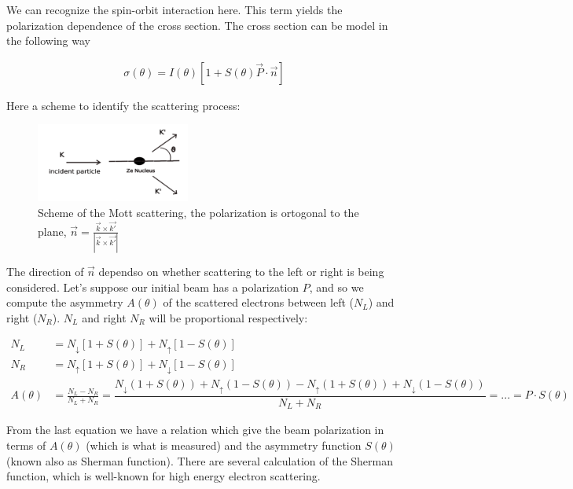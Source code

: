 We can recognize the spin-orbit interaction here. This term yields the polarization dependence of the cross section. The cross section can be model in the following way

\begin{align*}
\sigma(\theta) = I(\theta) [1 + S(\theta) \vec{P} \cdot \vec{n} ]
\end{align*}

Here a scheme to identify the scattering process: 

\begin{figure}[hbtp]
\centering
\includegraphics[width = 0.45\textwidth]{ExperimentalSetup/mottFig.png}
\caption{Scheme of the Mott scattering, the polarization is ortogonal to the plane,  $ \vec{n} = \frac{\vec{k} \times \vec{k'}}{|\vec{k} \times \vec{k'}|}$}
\end{figure}

The direction of $\vec{n}$ dependso on whether scattering to the left or right is being considered. Let's suppose our initial beam has a polarization $P$, and so we compute the asymmetry $A(\theta)$ of the scattered electrons between left ($N_{L}$) and right ($N_{R}$). $N_{L}$ and right $N_{R}$ will be proportional respectively:


\begin{align*}
N_{L} &= N_{\downarrow}[1 + S(\theta)] + N_{\uparrow}[1 - S(\theta)] \\
N_{R} &= N_{\uparrow}[1 + S(\theta)] + N_{\downarrow}[1 - S(\theta)]  \\
A(\theta) &= \frac{N_{L} - N_{R}}{N_{L} + N_{R}} = \dfrac{N_{\downarrow}(1 + S(\theta)) + N_{\uparrow}(1 - S(\theta)) - N_{\uparrow}(1 + S(\theta)) + N_{\downarrow}(1 - S(\theta))}{N_{L} + N_{R}} = ... = P \cdot S(\theta)
\end{align*}

From the last equation we have a relation which give the beam polarization in terms of $A(\theta)$ (which is what is measured) and the asymmetry function $S(\theta)$ (known also as Sherman function). There are several calculation of the Sherman function, which is well-known for high energy electron scattering.

